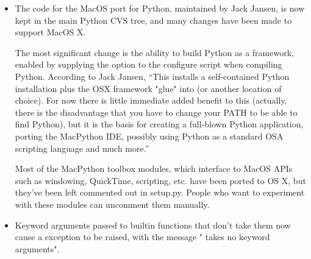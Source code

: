 \documentclass{howto}
\begin{document}
\begin{itemize}

  \item The code for the MacOS port for Python, maintained by Jack
  Jansen, is now kept in the main Python CVS tree, and many changes
  have been made to support MacOS X.

The most significant change is the ability to build Python as a
framework, enabled by supplying the 
option to the configure script when compiling Python.  According to
Jack Jansen, ``This installs a self-contained Python installation plus
the OSX framework "glue" into
 (or another location of
choice).  For now there is little immediate added benefit to this
(actually, there is the disadvantage that you have to change your PATH
to be able to find Python), but it is the basis for creating a
full-blown Python application, porting the MacPython IDE, possibly
using Python as a standard OSA scripting language and much more.''

Most of the MacPython toolbox modules, which interface to MacOS APIs
such as windowing, QuickTime, scripting, etc. have been ported to OS
X, but they've been left commented out in setup.py.  People who want
to experiment with these modules can uncomment them manually.

 

  
  \item Keyword arguments passed to builtin functions that don't take them
  now cause a  exception to be raised, with the
  message " takes no keyword arguments".
  

\end{itemize}
\end{document}
